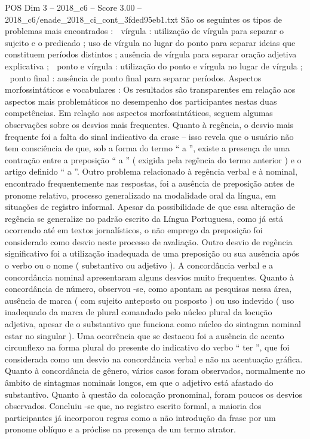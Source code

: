 \begin{textsample}{POS Dim 3 – 2018\_c6 – Score 3.00 – 2018\_c6/enade\_2018\_ci\_cont\_3fded95eb1.txt}
São os seguintes os tipos de problemas mais encontrados :  vírgula : utilização de vírgula para separar o sujeito e o predicado ; uso de vírgula no lugar do ponto para separar ideias que constituem períodos distintos ; ausência de vírgula para separar oração adjetiva explicativa ;  ponto e vírgula : utilização do ponto e vírgula no lugar de vírgula ;  ponto final : ausência de ponto final para separar períodos.
Aspectos morfossintáticos e vocabulares : Os resultados são transparentes em relação aos aspectos mais problemáticos no desempenho dos participantes nestas duas competências.
Em relação aos aspectos morfossintáticos, seguem algumas observações sobre os desvios mais frequentes.
Quanto à regência, o desvio mais frequente foi a falta do sinal indicativo da crase – isso revela que o usuário não tem consciência de que, sob a forma do termo “ a ”, existe a presença de uma contração entre a preposição “ a ” ( exigida pela regência do termo anterior ) e o artigo definido “ a ”.
Outro problema relacionado à regência verbal e à nominal, encontrado frequentemente nas respostas, foi a ausência de preposição antes de pronome relativo, processo generalizado na modalidade oral da língua, em situações de registro informal.
Apesar da possibilidade de que essa alteração de regência se generalize no padrão escrito da Língua Portuguesa, como já está ocorrendo até em textos jornalísticos, o não emprego da preposição foi considerado como desvio neste processo de avaliação.
Outro desvio de regência significativo foi a utilização inadequada de uma preposição ou sua ausência após o verbo ou o nome ( substantivo ou adjetivo ).
A concordância verbal e a concordância nominal apresentaram alguns desvios muito frequentes.
Quanto à concordância de número, observou -se, como apontam as pesquisas nessa área, ausência de marca ( com sujeito anteposto ou posposto ) ou uso indevido ( uso inadequado da marca de plural comandado pelo núcleo plural da locução adjetiva, apesar de o substantivo que funciona como núcleo do sintagma nominal estar no singular ).
Uma ocorrência que se destacou foi a ausência de acento circunflexo na forma plural do presente do indicativo do verbo “ ter ”, que foi considerada como um desvio na concordância verbal e não na acentuação gráfica.
Quanto à concordância de gênero, vários casos foram observados, normalmente no âmbito de sintagmas nominais longos, em que o adjetivo está afastado do substantivo.
Quanto à questão da colocação pronominal, foram poucos os desvios observados.
Concluiu -se que, no registro escrito formal, a maioria dos participantes já incorporou regras como a não introdução da frase por um pronome oblíquo e a próclise na presença de um termo atrator.

\end{textsample}
